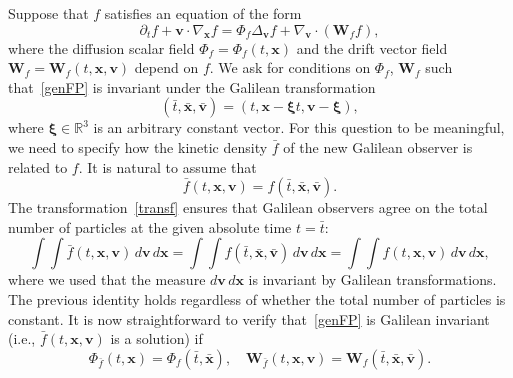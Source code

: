 \documentclass[12pt]{article}
\newcommand{\R}{\mathbb{R}}
\theoremstyle{definition}
\numberwithin{equation}{section}
\begin{document}
Suppose that $f$ satisfies an equation of the form
\begin{equation}\label{genFP}
\partial_tf+{\bm v}\cdot\nabla_{\bm x}f=\Phi_f\Delta_{\bm v}f+\nabla_{\bm v}\cdot({\bm W}_f f),
\end{equation}
where the diffusion scalar field $\Phi_f=\Phi_f(t,{\bm x})$ and the drift vector field ${\bm W}_f={\bm W}_f(t,{\bm x}, {\bm v})$ depend on $f$. 
We ask for conditions on $\Phi_f$, ${\bm W}_f$ such that~\eqref{genFP} is invariant under the Galilean transformation
\[
(\bar{t},\bar{{\bm x}}, \bar{{\bm v}})=
(t, {\bm x}-{\bm \xi}t, {\bm v}-{\bm \xi}),
\]
where ${\bm \xi}\in\R^3$ is an arbitrary constant vector. For this question to be meaningful, we need to specify how the kinetic density $\bar{f}$ of the new Galilean observer is related to $f$. 
It is natural to assume that
\begin{equation}\label{transf}
\bar{f}(t,{\bm x},{\bm v})=f(\bar{t},\bar{{\bm x}}, \bar{{\bm v}}).
\end{equation}
The transformation~\eqref{transf} ensures that Galilean observers agree on the total number of particles at the given absolute time $t=\bar{t}$:
\[
\int \int \bar{f}(t,{\bm x},{\bm v})\,d{\bm v}\,d{\bm x} = \int \int f(\bar{t},\bar{{\bm x}}, \bar{{\bm v}})\,d{\bm v}\,d{\bm x}=\int \int f(t,{\bm x},{\bm v})\,d{\bm v}\,d{\bm x},
\]
where we used that the measure $d{\bm v}\,d{\bm x}$ is invariant by Galilean transformations. The previous identity holds regardless of whether the total number of particles is constant.
It is now straightforward to verify that~\eqref{genFP} is Galilean invariant (i.e., $\bar{f}(t,{\bm x},{\bm v})$ is a solution) if 
\begin{equation}\label{trans}
\Phi_{\bar{f}}(t,{\bm x})=\Phi_f(\bar{t},\bar{{\bm x}}),\quad
{\bm W}_{\bar{f}}(t,{\bm x},{\bm v})={\bm W}_f(\bar{t},\bar{{\bm x}},\bar{{\bm v}}).
\end{equation} 
\end{document}
